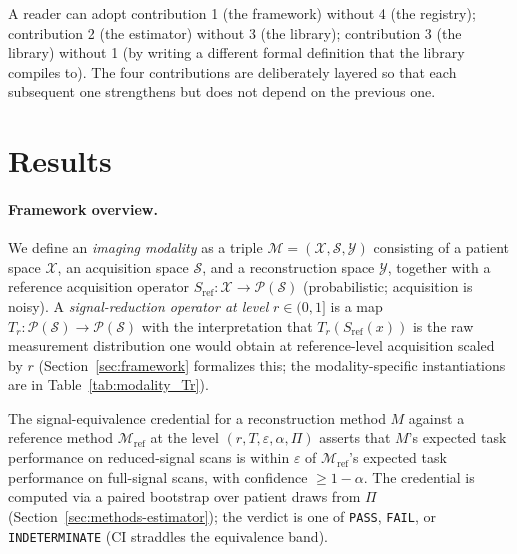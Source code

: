 \documentclass[twoside,11pt]{article}
\newcommand{\Mref}{\mathcal{M}_{\textrm{ref}}}
\newcommand{\Sref}{S_{\textrm{ref}}}
\begin{document}
A reader can adopt contribution 1 (the framework) without 4 (the registry); contribution 2 (the estimator) without 3 (the library); contribution 3 (the library) without 1 (by writing a different formal definition that the library compiles to). The four contributions are deliberately layered so that each subsequent one strengthens but does not depend on the previous one.

\section{Results}
\label{sec:results}

\paragraph{Framework overview.} We define an \emph{imaging modality} as a triple $\mathcal{M} = (\mathcal{X}, \mathcal{S}, \mathcal{Y})$ consisting of a patient space $\mathcal{X}$, an acquisition space $\mathcal{S}$, and a reconstruction space $\mathcal{Y}$, together with a reference acquisition operator $\Sref: \mathcal{X} \to \mathcal{P}(\mathcal{S})$ (probabilistic; acquisition is noisy). A \emph{signal-reduction operator at level} $r \in (0,1]$ is a map $T_r: \mathcal{P}(\mathcal{S}) \to \mathcal{P}(\mathcal{S})$ with the interpretation that $T_r(\Sref(x))$ is the raw measurement distribution one would obtain at reference-level acquisition scaled by $r$ (Section~\ref{sec:framework} formalizes this; the modality-specific instantiations are in Table~\ref{tab:modality_Tr}).

The signal-equivalence credential for a reconstruction method $M$ against a reference method $\Mref$ at the level $(r, T, \varepsilon, \alpha, \Pi)$ asserts that $M$'s expected task performance on reduced-signal scans is within $\varepsilon$ of $\Mref$'s expected task performance on full-signal scans, with confidence $\geq 1-\alpha$. The credential is computed via a paired bootstrap over patient draws from $\Pi$ (Section~\ref{sec:methods-estimator}); the verdict is one of \texttt{PASS}, \texttt{FAIL}, or \texttt{INDETERMINATE} (CI straddles the equivalence band).
\end{document}
